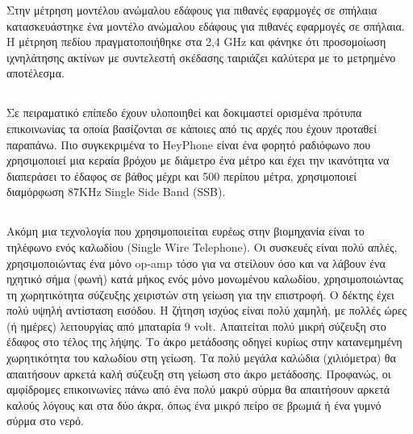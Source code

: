 \documentclass[12pt, greek]{article}
\begin{document}
\begin{multicols*}{2}
        Στην μέτρηση μοντέλου ανώμαλου εδάφους για πιθανές εφαρμογές σε σπήλαια \cite{soo_measurement_2019}
        κατασκευάστηκε ένα μοντέλο ανώμαλου εδάφους για πιθανές εφαρμογές σε σπήλαια. Η μέτρηση πεδίου
        πραγματοποιήθηκε στα 2,4 GHz και φάνηκε ότι προσομοίωση ιχνηλάτησης ακτίνων με συντελεστή 
        σκέδασης ταιριάζει καλύτερα με το μετρημένο αποτέλεσμα.

    \subsection{}
        Σε πειραματικό επίπεδο έχουν υλοποιηθεί και δοκιμαστεί ορισμένα πρότυπα επικοινωνίας
        τα οποία βασίζονται σε κάποιες από τις αρχές που έχουν προταθεί παραπάνω. Πιο
        συγκεκριμένα το HeyPhone είναι ένα φορητό ραδιόφωνο που χρησιμοποιεί μια κεραία βρόχου
        με διάμετρο ένα μέτρο και έχει την ικανότητα να διαπεράσει το έδαφος σε βάθος μέχρι
        και 500 περίπου μέτρα, χρησιμοποιεί διαμόρφωση 87KHz Single Side Band (SSB).

    \subsection{}
        Ακόμη μια τεχνολογία που χρησιμοποιείται ευρέως στην βιομηχανία είναι το τηλέφωνο
        ενός καλωδίου (Single Wire Telephone). Οι συσκευές είναι πολύ απλές, χρησιμοποιώντας
        ένα μόνο op-amp τόσο για να στείλουν όσο και να λάβουν ένα ηχητικό σήμα (φωνή) κατά
        μήκος ενός μόνο μονωμένου καλωδίου, χρησιμοποιώντας τη χωρητικότητα σύζευξης χειριστών
        στη γείωση για την επιστροφή. Ο δέκτης έχει πολύ υψηλή αντίσταση εισόδου. Η ζήτηση
        ισχύος είναι πολύ χαμηλή, με πολλές ώρες (ή ημέρες) λειτουργίας από μπαταρία 9 volt.
        Απαιτείται πολύ μικρή σύζευξη στο έδαφος στο τέλος της λήψης. Το άκρο μετάδοσης οδηγεί
        κυρίως στην κατανεμημένη χωρητικότητα του καλωδίου στη γείωση. Τα πολύ μεγάλα καλώδια
        (χιλιόμετρα) θα απαιτήσουν αρκετά καλή σύζευξη στη γείωση στο άκρο μετάδοσης.
        Προφανώς, οι αμφίδρομες επικοινωνίες πάνω από ένα πολύ μακρύ σύρμα θα απαιτήσουν
        αρκετά καλούς λόγους και στα δύο άκρα, όπως ένα μικρό πείρο σε βρωμιά ή ένα γυμνό
        σύρμα στο νερό.

    \printbibliography
\end{multicols*}
\end{document}
